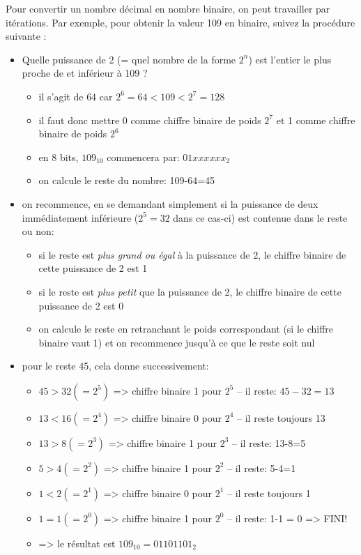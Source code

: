 Pour convertir un nombre décimal en nombre binaire, on peut travailler par itérations.
Par exemple, pour obtenir la valeur 109 en binaire, suivez la procédure suivante :

\begin{itemize}
\item Quelle puissance de 2 (= quel nombre de la forme $2^n$) est l’entier le plus proche de et inférieur à 109 ?
	\begin{itemize}
	\item il s'agit de $64$ car $2^6=64 < 109 < 2^7=128$
	\item il faut donc mettre 0 comme chiffre binaire de poids $2^7$ et 1 comme chiffre binaire de poids $2^6$
	\item en 8 bits, $109_{10}$ commencera par: $01xxxxxx_2$
	\item on calcule le reste du nombre: 109-64=45
	\end{itemize}
    
\item on recommence, en se demandant simplement si la puissance de deux immédiatement inférieure ($2^5=32$ dans ce cas-ci) est contenue dans le reste ou non:
	\begin{itemize}
	\item si le reste est \textit{plus grand ou égal} à la puissance de 2, le chiffre binaire de cette puissance de 2 est 1
	\item si le reste est \textit{plus petit} que la puissance de 2, le chiffre binaire de cette puissance de 2 est 0
	\item on calcule le reste en retranchant le poids correspondant (si le chiffre binaire vaut 1) et on recommence jusqu'à ce que le reste soit nul
	\end{itemize}
    
\item pour le reste 45, cela donne successivement:
	\begin{itemize}
	\item $45 > 32 (= 2^5)$ => chiffre binaire 1 pour $2^5$ – il reste: $45-32=13$
	\item $13 < 16 (= 2^4 )$ => chiffre binaire 0 pour $2^4$ – il reste toujours 13
	\item $13 > 8 (= 2^3 )$ => chiffre binaire 1 pour $2^3$ – il reste: 13-8=5
	\item $5 > 4 (= 2^2 )$ => chiffre binaire 1 pour $2^2$ – il reste: 5-4=1
	\item $1 < 2 (= 2^1 )$ => chiffre binaire 0 pour $2^1$ – il reste toujours 1
	\item $1 = 1 (= 2^0 )$ => chiffre binaire 1 pour $2^0$ – il reste: 1-1 = 0 => FINI!
	\item => le résultat est $109_{10} = 01101101_2$
	\end{itemize}
\end{itemize}

